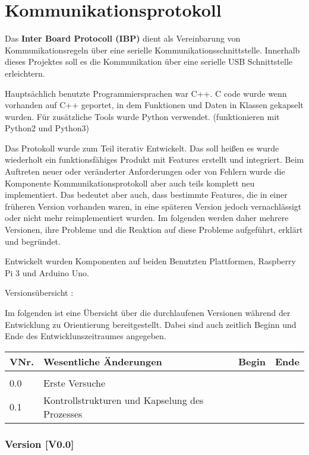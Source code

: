 
\section{Kommunikationsprotokoll}
Das \textbf{Inter Board Protocoll (IBP)} dient als Vereinbarung von Kommunikationsregeln über eine serielle Kommunikationsschnittstelle.
Innerhalb dieses Projektes soll es die Kommunikation über eine serielle USB Schnittstelle erleichtern.

Hauptsächlich benutzte Programmiersprachen war C++. 
C code wurde wenn vorhanden auf C++ geportet, in dem Funktionen und Daten in Klassen gekapselt wurden.
Für zusätzliche Tools wurde Python verwendet. (funktionieren mit Python2 und Python3)

Das Protokoll wurde zum Teil iterativ Entwickelt.
Das soll heißen es wurde wiederholt ein funktionsfähiges Produkt mit Features erstellt und integriert. Beim Auftreten neuer oder veränderter Anforderungen oder von Fehlern wurde die Komponente Kommunikationsprotokoll aber auch teils komplett neu implementiert.
Das bedeutet aber auch, dass bestimmte Features, die in einer früheren Version vorhanden waren, in eine späteren Version jedoch vernachlässigt oder nicht mehr reimplementiert wurden.
Im folgenden werden daher mehrere Versionen, ihre Probleme und die Reaktion auf diese Probleme aufgeführt, erklärt und begründet.

Entwickelt wurden Komponenten auf beiden Benutzten Plattformen, Raspberry Pi 3 und Arduino Uno.

Versionsübersicht : 

Im folgenden ist eine Übersicht über die durchlaufenen Versionen während der Entwicklung zu Orientierung bereitgestellt.
Dabei sind auch zeitlich Beginn und Ende des Entwicklunszeitraumes angegeben.

\begin{tabular}{l l l l}
	VNr. & Wesentliche Änderungen & Begin & Ende \\
	\hline\\
	0.0 & Erste Versuche & & \\
	0.1 & Kontrollstrukturen und Kapselung des Prozesses & & \\
\end{tabular}



\subsubsection{Version [V0.0]}

